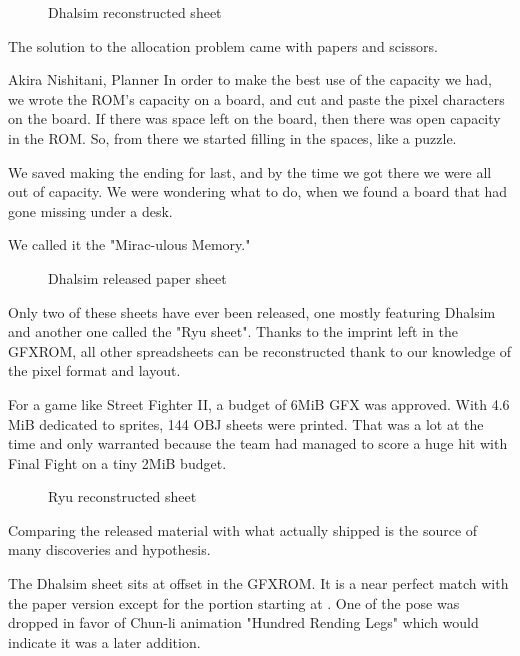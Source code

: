  \begin{figure}[H]
\caption*{Dhalsim reconstructed sheet}
\end{figure}

The solution to the allocation problem came with papers and scissors.

\begin{q}{Akira Nishitani, Planner \cite{sf2devinterview}}
In order to make the best use of the capacity we had, we wrote the ROM’s capacity on a board, and cut and paste the pixel characters on the board. If there was space left on the board, then there was open capacity in the ROM. So, from there we started filling in the spaces, like a puzzle. 

We saved making the ending for last, and by the time we got there we were all out of capacity. We were wondering what to do, when we found a board that had gone missing under a desk.

We called it the "Mirac-ulous Memory."
\end{q}



 \begin{figure}[H]
\caption*{Dhalsim released paper sheet}
\end{figure}

Only two of these sheets have ever been released, one mostly featuring Dhalsim\cite{ffdevinterview} and another one called the "Ryu sheet"\cite{htmcc}. Thanks to the imprint left in the GFXROM, all other spreadsheets can be reconstructed thank to our knowledge of the pixel format and layout. 



For a game like Street Fighter II, a budget of 6MiB GFX was approved. With 4.6 MiB dedicated to sprites, 144 OBJ sheets were printed. That was a lot at the time and only warranted because the team had managed to score a huge hit with Final Fight on a tiny 2MiB budget\cite{gameMaestro4}. 




 \begin{figure}[H]
\caption*{Ryu reconstructed sheet}
\end{figure}


Comparing the released material with what actually shipped is the source of many discoveries and hypothesis. 

The Dhalsim sheet sits at offset  in the GFXROM. It is a near perfect match with the paper version except for the portion starting at . One of the pose was dropped in favor of Chun-li animation "Hundred Rending Legs" which would indicate it was a later addition. 

